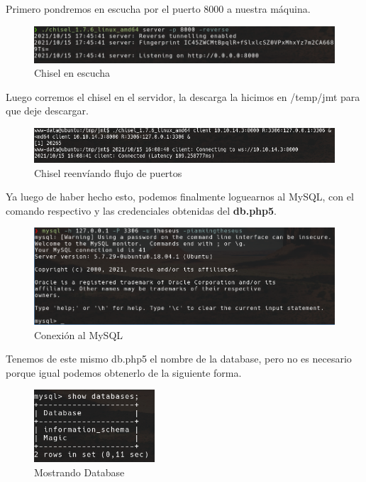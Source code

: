 \documentclass{article}
\begin{document}
\clearpage

Primero pondremos en escucha por el puerto 8000 a nuestra máquina.

\begin{figure}[h!]
	\center 
	\includegraphics[width=\textwidth]{images/magic/chisel-server.png}
	\caption{Chisel en escucha}
\end{figure}

Luego corremos el chisel en el servidor, la descarga la hicimos en /temp/jmt para que deje descargar.
\begin{figure}[h!]
	\center 
	\includegraphics[width=\textwidth]{images/magic/chisel-cliente.png}
	\caption{Chisel reenvíando flujo de puertos}
\end{figure}

Ya luego de haber hecho esto, podemos finalmente loguearnos al MySQL, con el comando respectivo y las credenciales obtenidas del \textbf{db.php5}.
\begin{figure}[h!]
	\center 
	\includegraphics[width=\textwidth]{images/magic/conexion-mysql.png}
	\caption{Conexión al MySQL}
\end{figure}

Tenemos de este mismo db.php5 el nombre de la database, pero no es necesario porque igual podemos obtenerlo de la siguiente forma.
\begin{figure}[h!]
	\center 
	\includegraphics[width=0.4\textwidth]{images/magic/mostrando-tablas.png}
	\caption{Mostrando Database}
\end{figure}
\end{document}
